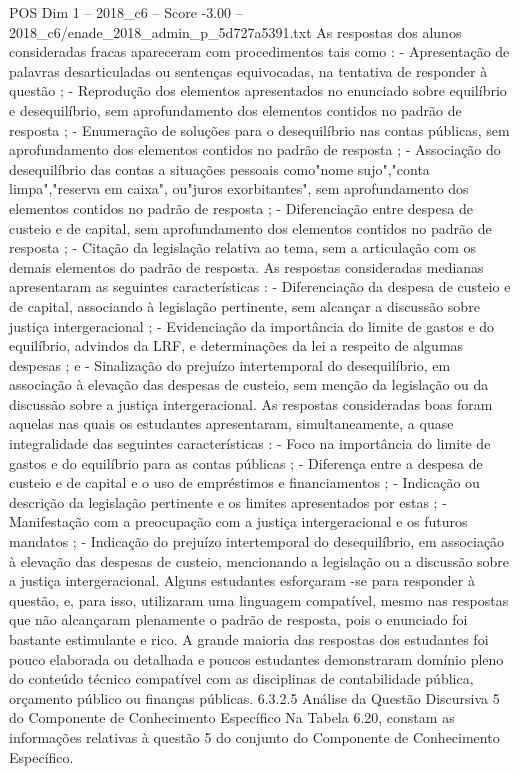 \begin{textsample}{POS Dim 1 – 2018\_c6 – Score -3.00 – 2018\_c6/enade\_2018\_admin\_p\_5d727a5391.txt}
As respostas dos alunos consideradas fracas apareceram com procedimentos tais como : - Apresentação de palavras desarticuladas ou sentenças equivocadas, na tentativa de responder à questão ; - Reprodução dos elementos apresentados no enunciado sobre equilíbrio e desequilíbrio, sem aprofundamento dos elementos contidos no padrão de resposta ; - Enumeração de soluções para o desequilíbrio nas contas públicas, sem aprofundamento dos elementos contidos no padrão de resposta ; - Associação do desequilíbrio das contas a situações pessoais como"nome sujo","conta limpa","reserva em caixa", ou"juros exorbitantes", sem aprofundamento dos elementos contidos no padrão de resposta ; - Diferenciação entre despesa de custeio e de capital, sem aprofundamento dos elementos contidos no padrão de resposta ; - Citação da legislação relativa ao tema, sem a articulação com os demais elementos do padrão de resposta.
As respostas consideradas medianas apresentaram as seguintes características : - Diferenciação da despesa de custeio e de capital, associando à legislação pertinente, sem alcançar a discussão sobre justiça intergeracional ; - Evidenciação da importância do limite de gastos e do equilíbrio, advindos da LRF, e determinações da lei a respeito de algumas despesas ; e - Sinalização do prejuízo intertemporal do desequilíbrio, em associação à elevação das despesas de custeio, sem menção da legislação ou da discussão sobre a justiça intergeracional.
As respostas consideradas boas foram aquelas nas quais os estudantes apresentaram, simultaneamente, a quase integralidade das seguintes características : - Foco na importância do limite de gastos e do equilíbrio para as contas públicas ; - Diferença entre a despesa de custeio e de capital e o uso de empréstimos e financiamentos ; - Indicação ou descrição da legislação pertinente e os limites apresentados por estas ; - Manifestação com a preocupação com a justiça intergeracional e os futuros mandatos ; - Indicação do prejuízo intertemporal do desequilíbrio, em associação à elevação das despesas de custeio, mencionando a legislação ou a discussão sobre a justiça intergeracional.
Alguns estudantes esforçaram -se para responder à questão, e, para isso, utilizaram uma linguagem compatível, mesmo nas respostas que não alcançaram plenamente o padrão de resposta, pois o enunciado foi bastante estimulante e rico.
A grande maioria das respostas dos estudantes foi pouco elaborada ou detalhada e poucos estudantes demonstraram domínio pleno do conteúdo técnico compatível com as disciplinas de contabilidade pública, orçamento público ou finanças públicas. 6.3.2.5 Análise da Questão Discursiva 5 do Componente de Conhecimento Específico Na Tabela 6.20, constam as informações relativas à questão 5 do conjunto do Componente de Conhecimento Específico.

\end{textsample}
